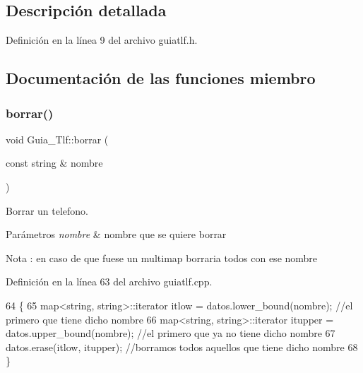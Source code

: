 \subsection{Descripción detallada}


Definición en la línea 9 del archivo guiatlf.\+h.



\subsection{Documentación de las funciones miembro}
\mbox{\label{classGuia__Tlf_a57e32bbc9e76567d22e5275d4d2a6515}} 
\subsubsection{\texorpdfstring{borrar()}{borrar()}\hspace{0.1cm}{\footnotesize\ttfamily [1/2]}}
{\footnotesize\ttfamily void Guia\+\_\+\+Tlf\+::borrar (\begin{DoxyParamCaption}\item[{const string \&}]{nombre }\end{DoxyParamCaption})}



Borrar un telefono. 


\begin{DoxyParams}{Parámetros}
{\em nombre} & nombre que se quiere borrar \\
\hline
\end{DoxyParams}
\begin{DoxyNote}{Nota}
\+: en caso de que fuese un multimap borraria todos con ese nombre 
\end{DoxyNote}


Definición en la línea 63 del archivo guiatlf.\+cpp.


\begin{DoxyCode}
64 \{
65     map<string, string>::iterator itlow = datos.lower\_bound(nombre);   \textcolor{comment}{//el primero que tiene dicho nombre}
66     map<string, string>::iterator itupper = datos.upper\_bound(nombre); \textcolor{comment}{//el primero que ya no tiene dicho
       nombre}
67     datos.erase(itlow, itupper);                                       \textcolor{comment}{//borramos todos aquellos que tiene
       dicho nombre}
68 \}
\end{DoxyCode}
\mbox{\label{classGuia__Tlf_af8adac24fd35985b9016a4a38cca60f4}} 
